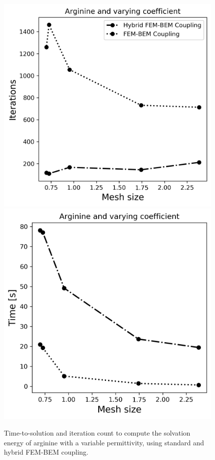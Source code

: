\begin{figure}
\centering
\includegraphics[width=0.45\linewidth]{Arginine_varying_coeff_iter.png}
\includegraphics[width=0.45\linewidth]{Arginine_varying_coeff_time.png}
\caption{Time-to-solution and iteration count to compute the solvation energy of arginine with a variable permittivity, using standard and hybrid FEM-BEM coupling. %
}
\label{fig:arg_variable}
\end{figure}

%


